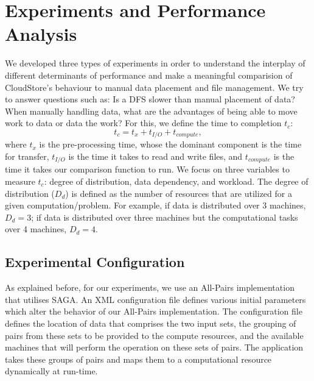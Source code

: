 \documentclass{rspublic}
\begin{document}
\section{Experiments and Performance Analysis} 
We developed three types of experiments in order to understand the
interplay of different determinants of performance and make a
meaningful comparision of CloudStore's behaviour to manual data
placement and file management. We try to answer questions such as: Is
a DFS slower than manual placement of data?  When manually handling
data, what are the advantages of being able to move work to data or
data the work? For this, we define the time to completion $t_c$:
 \begin{equation}
t_c = t_x + t_{I/O} + t_{compute},
\end{equation}
where $t_x$ is the pre-processing time, whose the dominant component is
the time for transfer, $t_{I/O}$ is the time it takes to read and write
files, and $t_{compute}$ is the time it takes our comparison function to
run. We focus on three variables to measure $t_c$: degree of
distribution, data dependency, and workload. The degree of distribution
($D_d$) is defined as the number of resources that are utilized for a
given computation/problem. For example, if data is distributed over 3
machines, $D_d=3$; if data is distributed over three machines but the
computational tasks over 4 machines, $D_d=4$.

\vspace{-0.3cm}

\subsection{Experimental Configuration}

As explained before, for our experiments, we use an All-Pairs
implementation that utilises SAGA. An XML configuration file defines
various initial parameters which alter the behavior of our All-Pairs
implementation. The configuration file defines the location of data that
comprises the two input sets, the grouping of pairs from these sets to
be provided to the compute resources, and the available machines that
will perform the operation on these sets of pairs. The application takes
these groups of pairs and maps them to a computational resource
dynamically at run-time.
\end{document}
